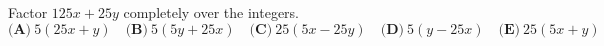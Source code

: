 Factor $125x+25y$ completely over the integers.
\[\textbf{(A)}~5(25x+y)\quad\textbf{(B)}~5(5y+25x)\quad\textbf{(C)}~25(5x-25y)\quad\textbf{(D)}~5(y-25x)\quad\textbf{(E)}~25(5x+y)\]
